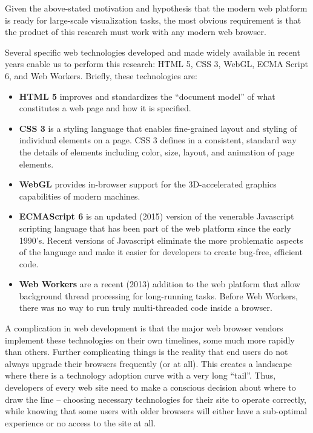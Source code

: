 Given the above-stated motivation and hypothesis that the modern web
platform is ready for large-scale visualization tasks, the most obvious
requirement is that the product of this research must work with any
modern web browser.

Several specific web technologies developed and made widely available in
recent years enable us to perform this research: HTML 5, CSS 3, WebGL,
ECMA Script 6, and Web Workers. Briefly, these technologies are:

\begin{itemize}
\tightlist
\item
  \textbf{HTML 5} improves and standardizes the ``document model'' of
  what constitutes a web page and how it is specified.
\item
  \textbf{CSS 3} is a styling language that enables fine-grained layout
  and styling of individual elements on a page. CSS 3 defines in a
  consistent, standard way the details of elements including color,
  size, layout, and animation of page elements.
\item
  \textbf{WebGL} provides in-browser support for the 3D-accelerated
  graphics capabilities of modern machines.
\item
  \textbf{ECMAScript 6} is an updated (2015) version of the venerable
  Javascript scripting language that has been part of the web platform
  since the early 1990's. Recent versions of Javascript eliminate the
  more problematic aspects of the language and make it easier for
  developers to create bug-free, efficient code.
\item
  \textbf{Web Workers} are a recent (2013) addition to the web platform
  that allow background thread processing for long-running tasks. Before
  Web Workers, there was no way to run truly multi-threaded code inside
  a browser.
\end{itemize}

A complication in web development is that the major web browser vendors
implement these technologies on their own timelines, some much more
rapidly than others. Further complicating things is the reality that end
users do not always upgrade their browsers frequently (or at all). This
creates a landscape where there is a technology adoption curve with a
very long ``tail''. Thus, developers of every web site need to make a
conscious decision about where to draw the line -- choosing necessary
technologies for their site to operate correctly, while knowing that
some users with older browsers will either have a sub-optimal experience
or no access to the site at all.

